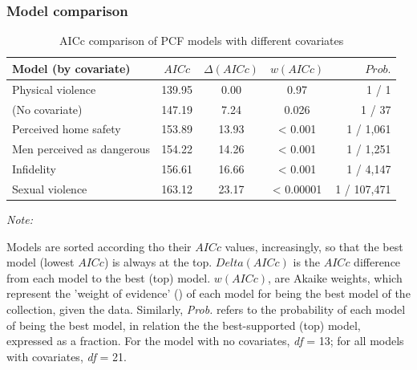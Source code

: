\documentclass[
  bookmarksnumbered]{article}
\newenvironment{Shaded}{\begin{snugshade}}{\end{snugshade}}
\newcommand{\AttributeTok}[1]{\textcolor[rgb]{0.80,0.80,0.80}{#1}}
\newcommand{\FunctionTok}[1]{\textcolor[rgb]{0.94,0.94,0.56}{#1}}
\newcommand{\NormalTok}[1]{\textcolor[rgb]{0.80,0.80,0.80}{#1}}
\newcommand{\OtherTok}[1]{\textcolor[rgb]{0.94,0.94,0.56}{#1}}
\newcommand{\SpecialCharTok}[1]{\textcolor[rgb]{0.86,0.64,0.64}{#1}}
\newcommand{\StringTok}[1]{\textcolor[rgb]{0.80,0.58,0.58}{#1}}
\begin{document}
\subsubsection{Model comparison}\label{model-comparison-3}

\begin{Shaded}
\end{Shaded}

\begin{table}[H]
\centering
\caption{\label{tab:comp-m4}AICc comparison of PCF models with different covariates}
\centering
\begin{threeparttable}
\begin{tabular}[t]{lcccr}
\toprule
Model (by covariate) & $AICc$ & $\Delta(AICc)$ & $w(AICc)$ & $Prob.$\\
\midrule
Physical violence & 139.95 & 0.00 & 0.97 & 1 / 1\\
(No covariate) & 147.19 & 7.24 & 0.026 & 1 / 37\\
Perceived home safety & 153.89 & 13.93 & < 0.001 & 1 / 1,061\\
Men perceived as dangerous & 154.22 & 14.26 & < 0.001 & 1 / 1,251\\
Infidelity & 156.61 & 16.66 & < 0.001 & 1 / 4,147\\
Sexual violence & 163.12 & 23.17 & < 0.00001 & 1 / 107,471\\
\bottomrule
\end{tabular}
\begin{tablenotes}[para]
\item \textit{Note: } 
\item Models are sorted according tho their $AICc$ values, increasingly, 
             so that the best model (lowest $AICc$) is always at the top. 
             $Delta(AICc)$ is the $AICc$ difference from each model to the best (top) model. 
             $w(AICc)$, are Akaike weights, which represent the 'weight of evidence'
             (\cite{portetPrimerModelSelection2020}) of each model for being the best model 
             of the collection, given the data. 
             Similarly, \textit{Prob.} refers to the probability of each model of being the 
             best model, in relation the the best-supported (top) model, expressed as a 
             fraction. For the model with no covariates, \textit{df} = 13; for all models 
             with covariates, \textit{df} = 21.
\end{tablenotes}
\end{threeparttable}
\end{table}
\end{document}
